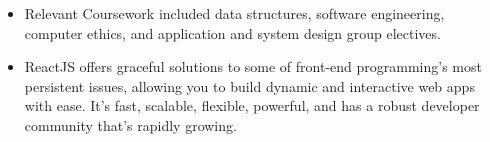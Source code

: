         \begin{itemize}
             \item Relevant Coursework included data structures, software engineering, computer ethics, and application and system design group electives.
          \end{itemize}

        \medskip

         \begin{itemize}
             \item ReactJS offers graceful solutions to some of front-end programming’s most persistent issues, allowing you to build dynamic and interactive web apps with ease. It’s fast, scalable, flexible, powerful, and has a robust developer community that’s rapidly growing. 
          \end{itemize}